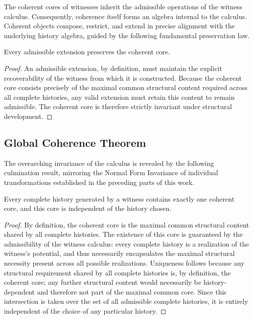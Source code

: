 \documentclass[12pt,anyside]{book}
\begin{document}
The coherent cores of witnesses inherit the admissible operations of the witness calculus. Consequently, coherence itself forms an algebra internal to the calculus. Coherent objects compose, restrict, and extend in precise alignment with the underlying history algebra, guided by the following fundamental preservation law.

\begin{theorem}
Every admissible extension preserves the coherent core.
\end{theorem}
\begin{proof}
An admissible extension, by definition, must maintain the explicit recoverability of the witness from which it is constructed. Because the coherent core consists precisely of the maximal common structural content required across all complete histories, any valid extension must retain this content to remain admissible. The coherent core is therefore strictly invariant under structural development.
\end{proof}

\subsection{Global Coherence Theorem}
The overarching invariance of the calculus is revealed by the following culmination result, mirroring the Normal Form Invariance of individual transformations established in the preceding parts of this work.

\begin{theorem}
Every complete history generated by a witness contains exactly one coherent core, and this core is independent of the history chosen.
\end{theorem}
\begin{proof}
By definition, the coherent core is the maximal common structural content shared by all complete histories. The existence of this core is guaranteed by the admissibility of the witness calculus: every complete history is a realization of the witness's potential, and thus necessarily encapsulates the maximal structural necessity present across all possible realizations. Uniqueness follows because any structural requirement shared by all complete histories is, by definition, the coherent core; any further structural content would necessarily be history-dependent and therefore not part of the maximal common core. Since this intersection is taken over the set of all admissible complete histories, it is entirely independent of the choice of any particular history.
\end{proof}
\end{document}
